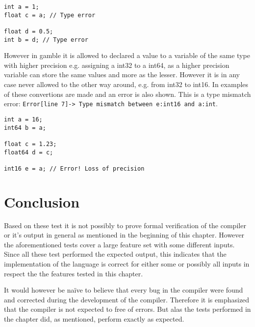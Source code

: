 \begin{lstlisting}[caption={Examples of type incompatibilities \gls{gamble} to demonstrate the type checker.},label={lst:type2},frame=tb]
int a = 1;
float c = a; // Type error

float d = 0.5;
int b = d; // Type error
\end{lstlisting}

However in \gls{gamble} it is allowed to declared a value to a variable of the same type with higher precision e.g. assigning a int32 to a int64, as a higher precision variable can store the same values and more as the lesser.
However it is in any case never allowed to the other way around, e.g. from int32 to int16. 
In  examples of these convertions are made and an error is also shown.  
This is a type mismatch error: \texttt{Error[line    7]-> Type mismatch between e:int16 and a:int}.

\begin{lstlisting}[caption={Examples of type conversions and an error in \gls{gamble} to demonstrate the type checker.},label={lst:type3},frame=tb]
int a = 16;
int64 b = a;

float c = 1.23;
float64 d = c;

int16 e = a; // Error! Loss of precision
\end{lstlisting}

\section{Conclusion}
Based on these test it is not possibly to prove formal verification of the compiler or it's output in general as mentioned in the beginning of this chapter.
However the aforementioned tests cover a large feature set with some different inputs.
Since all these test performed the expected output, this indicates that the implementation of the language is correct for either some or possibly all inputs in respect the the features tested in this chapter.

It would however be naïve to believe that every bug in the compiler were found and corrected during the development of the compiler.%
Therefore it is emphasized that the compiler is not expected to free of errors. %
But alas the tests performed in the chapter did, as mentioned, perform exactly as expected.